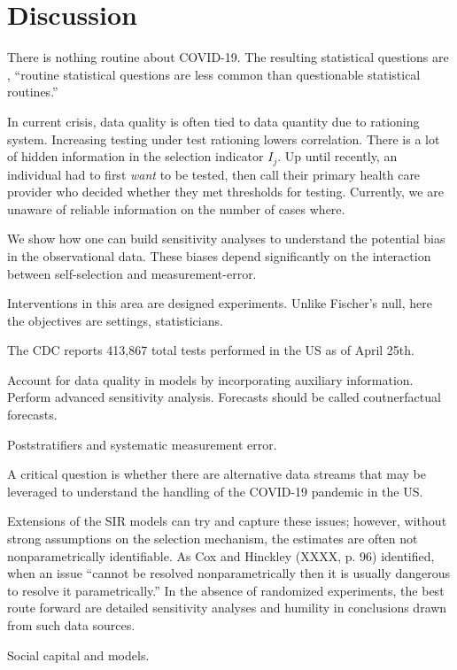 \documentclass[aoas]{amsart}
\begin{document}
\section{Discussion}

There is nothing routine about COVID-19.  The resulting statistical questions are
, ``routine statistical questions are less common than questionable statistical routines.''


In current crisis, data quality is often tied to data quantity due to rationing system.  Increasing testing under test rationing lowers correlation.  There is a lot of hidden information in the selection indicator $I_j$.  Up until recently, an individual had to first \emph{want} to be tested, then call their primary health care provider who decided whether they met thresholds for testing. Currently, we are unaware of reliable information on the number of cases where.

We show how one can build sensitivity analyses to understand the potential bias in the observational data.  These biases depend significantly on the interaction between self-selection and measurement-error.

Interventions in this area are designed experiments.  Unlike Fischer's null, here the objectives are settings, statisticians.

The CDC reports 413,867 total tests performed in the US as of April 25th.

Account for data quality in models by incorporating auxiliary information.  Perform advanced sensitivity analysis.  Forecasts should be called coutnerfactual forecasts.

Poststratifiers and systematic measurement error.

A critical question is whether there are alternative data streams that may be leveraged to understand the handling of the COVID-19 pandemic in the US.

Extensions of the SIR models can try and capture these issues; however, without strong assumptions on the selection mechanism, the estimates are often not nonparametrically identifiable.  As Cox and Hinckley (XXXX, p. 96) identified, when an issue ``cannot be resolved nonparametrically then it is usually dangerous to resolve it parametrically.'' In the absence of randomized experiments, the best route forward are detailed sensitivity analyses and humility in conclusions drawn from such data sources.

Social capital and models.

\appendix
\end{document}
